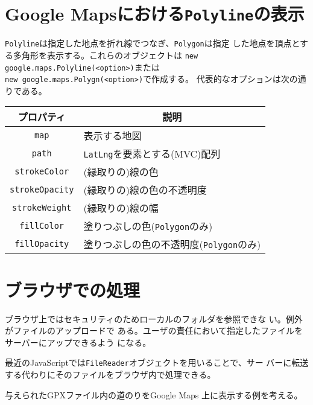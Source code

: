  \section{Google Mapsにおける\texttt{Polyline}の表示}
 \texttt{Polyline}は指定した地点を折れ線でつなぎ、\texttt{Polygon}は指定
 した地点を頂点とする多角形を表示する。これらのオブジェクトは
 \texttt{new google.maps.Polyline(<option>)}または\\\texttt{new
       google.maps.Polygn(<option>)}で作成する。
 代表的なオプションは次の通りである。
\begin{center}
 \begin{tabular}{|c|p{}|}\hline
  プロパティ& \multicolumn{1}{c|}{説明}\\\hline
  \texttt{map}& 表示する地図\\ \hline
  \texttt{path}& \texttt{LatLng}を要素とする(MVC)配列\\ \hline
  \texttt{strokeColor}& (縁取りの)線の色\\ \hline
  \texttt{strokeOpacity}& (縁取りの)線の色の不透明度\\ \hline
  \texttt{strokeWeight}& (縁取りの)線の幅\\ \hline
  \texttt{fillColor}& 塗りつぶしの色(\texttt{Polygon}のみ)\\ \hline
  \texttt{fillOpacity}& 塗りつぶしの色の不透明度(\texttt{Polygon}のみ)\\ \hline
 \end{tabular}
\end{center}

 \section{ブラウザでの処理}
 ブラウザ上ではセキュリティのためローカルのフォルダを参照できな
 い。例外がファイルのアップロードで
 ある。ユーザの責任において指定したファイルをサーバーにアップできるよう
 になる。

 最近のJavaScriptでは\texttt{FileReader}オブジェクトを用いることで、サー
 バーに転送する代わりにそのファイルをブラウザ内で処理できる。

 与えられたGPXファイル内の道のりをGoogle Maps 上に表示する例を考える。

